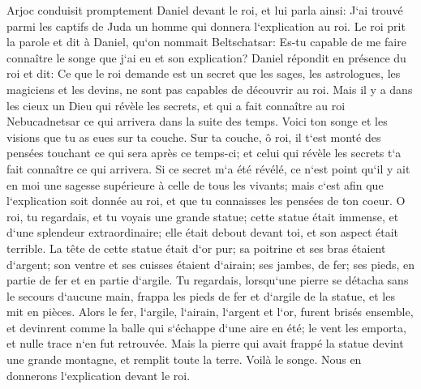 \verse Arjoc conduisit promptement Daniel devant le roi, et lui parla ainsi: J`ai trouvé parmi les captifs de Juda un homme qui donnera l`explication au roi. 
\verse Le roi prit la parole et dit à Daniel, qu`on nommait Beltschatsar: Es-tu capable de me faire connaître le songe que j`ai eu et son explication? 
\verse Daniel répondit en présence du roi et dit: Ce que le roi demande est un secret que les sages, les astrologues, les magiciens et les devins, ne sont pas capables de découvrir au roi. 
\verse Mais il y a dans les cieux un Dieu qui révèle les secrets, et qui a fait connaître au roi Nebucadnetsar ce qui arrivera dans la suite des temps. Voici ton songe et les visions que tu as eues sur ta couche. 
\verse Sur ta couche, ô roi, il t`est monté des pensées touchant ce qui sera après ce temps-ci; et celui qui révèle les secrets t`a fait connaître ce qui arrivera. 
\verse Si ce secret m`a été révélé, ce n`est point qu`il y ait en moi une sagesse supérieure à celle de tous les vivants; mais c`est afin que l`explication soit donnée au roi, et que tu connaisses les pensées de ton coeur. 
\verse O roi, tu regardais, et tu voyais une grande statue; cette statue était immense, et d`une splendeur extraordinaire; elle était debout devant toi, et son aspect était terrible. 
\verse La tête de cette statue était d`or pur; sa poitrine et ses bras étaient d`argent; son ventre et ses cuisses étaient d`airain; 
\verse ses jambes, de fer; ses pieds, en partie de fer et en partie d`argile. 
\verse Tu regardais, lorsqu`une pierre se détacha sans le secours d`aucune main, frappa les pieds de fer et d`argile de la statue, et les mit en pièces. 
\verse Alors le fer, l`argile, l`airain, l`argent et l`or, furent brisés ensemble, et devinrent comme la balle qui s`échappe d`une aire en été; le vent les emporta, et nulle trace n`en fut retrouvée. Mais la pierre qui avait frappé la statue devint une grande montagne, et remplit toute la terre. 
\verse Voilà le songe. Nous en donnerons l`explication devant le roi. 
